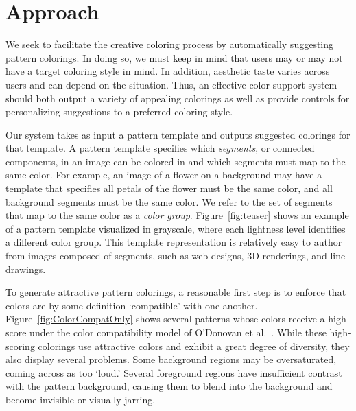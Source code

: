 \section{Approach}
\label{sec:approach}

We seek to facilitate the creative coloring process by automatically suggesting pattern colorings. In doing so, we must keep in mind that users may or may not have a target coloring style in mind. In addition, aesthetic taste varies across users and can depend on the situation. Thus, an effective color support system should both output a variety of appealing colorings as well as provide controls for personalizing suggestions to a preferred coloring style.

Our system takes as input a pattern template and outputs suggested colorings for that template. A pattern template specifies which \emph{segments}, or connected components, in an image can be colored in and which segments must map to the same color. For example, an image of a flower on a background may have a template that specifies all petals of the flower must be the same color, and all background segments must be the same color. We refer to the set of segments that map to the same color as a \emph{color group}. Figure~\ref{fig:teaser} shows an example of a pattern template visualized in grayscale, where each lightness level identifies a different color group. This template representation is relatively easy to author from images composed of segments, such as web designs, 3D renderings, and line drawings.

To generate attractive pattern colorings, a reasonable first step is to enforce that colors are by some definition `compatible' with one another. Figure~\ref{fig:ColorCompatOnly} shows several patterns whose colors receive a high score under the color compatibility model of O'Donovan et al.~. While these high-scoring colorings use attractive colors and exhibit a great degree of diversity, they also display several problems. Some background regions may be oversaturated, coming across as too `loud.' Several foreground regions have insufficient contrast with the pattern background, causing them to blend into the background and become invisible or visually jarring.

